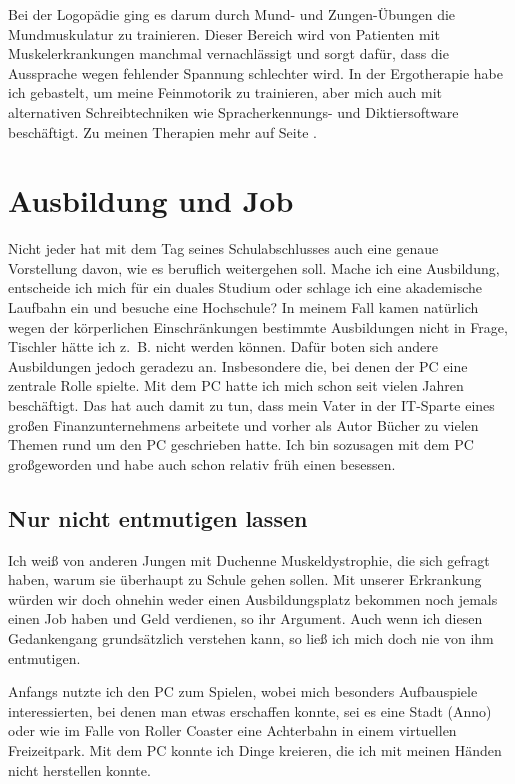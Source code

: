\documentclass[fontsize=14pt,a4paper,headinclude,DIV=calc,automark]{scrbook}
\begin{document}
Bei der Logopädie ging es darum durch Mund- und Zungen-Übungen die Mundmuskulatur zu trainieren. Dieser Bereich wird von Patienten mit Muskelerkrankungen manchmal vernachlässigt und sorgt dafür, dass die Aussprache wegen fehlender Spannung schlechter wird. In der Ergotherapie habe ich gebastelt, um meine Feinmotorik zu trainieren, aber mich auch mit alternativen Schreibtechniken wie Spracherkennungs- und Diktiersoftware beschäftigt. Zu meinen Therapien mehr auf Seite \pageref{sec:therapien_und_hilfsmittel}.

\section{Ausbildung und Job}

Nicht jeder hat mit dem Tag seines Schulabschlusses auch eine genaue Vorstellung davon, wie es beruflich weitergehen soll. Mache ich eine Ausbildung, entscheide ich mich für ein duales Studium oder schlage ich eine akademische Laufbahn ein und besuche eine Hochschule? In meinem Fall kamen natürlich wegen der körperlichen Einschränkungen bestimmte Ausbildungen nicht in Frage, Tischler hätte ich z.~B. nicht werden können. Dafür boten sich andere Ausbildungen jedoch geradezu an. Insbesondere die, bei denen der PC eine zentrale Rolle spielte. Mit dem PC hatte ich mich schon seit vielen Jahren beschäftigt. Das hat auch damit zu tun, dass mein Vater in der IT-Sparte eines großen Finanzunternehmens arbeitete und vorher als Autor Bücher zu vielen Themen rund um den PC geschrieben hatte. Ich bin sozusagen mit dem PC großgeworden und habe auch schon relativ früh einen besessen.

\subsection{Nur nicht entmutigen lassen}

Ich weiß von anderen Jungen mit Duchenne Muskeldystrophie, die sich gefragt haben, warum sie überhaupt zu Schule gehen sollen. Mit unserer Erkrankung würden wir doch ohnehin weder einen Ausbildungsplatz bekommen noch jemals einen Job haben und Geld verdienen, so ihr Argument. Auch wenn ich diesen Gedankengang grundsätzlich verstehen kann, so ließ ich mich doch nie von ihm entmutigen.

Anfangs nutzte ich den PC zum Spielen, wobei mich besonders Aufbauspiele interessierten, bei denen man etwas erschaffen konnte, sei es eine Stadt (Anno) oder wie im Falle von Roller Coaster eine Achterbahn in einem virtuellen Freizeitpark. Mit dem PC konnte ich Dinge kreieren, die ich mit meinen Händen nicht herstellen konnte.
\end{document}
